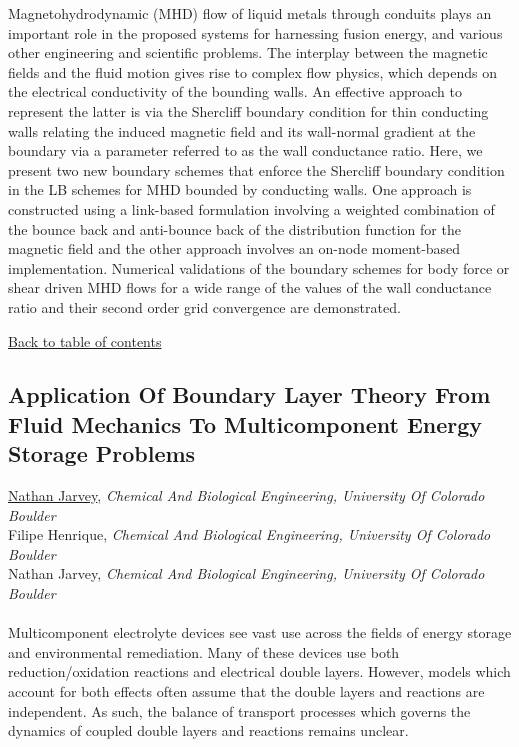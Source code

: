 \noindent Magnetohydrodynamic (MHD) flow of liquid metals through conduits plays an important role in the proposed systems for harnessing fusion energy, and various other engineering and scientific problems. The interplay between the magnetic fields and the fluid motion gives rise to complex flow physics, which depends on the electrical conductivity of the bounding walls. An effective approach to represent the latter is via the Shercliff boundary condition for thin conducting walls relating the induced magnetic field and its wall-normal gradient at the boundary via a parameter referred to as the wall conductance ratio. Here, we present two new boundary schemes that enforce the Shercliff boundary condition in the LB schemes for MHD bounded by conducting walls. One approach is constructed using a link-based formulation involving a weighted combination of the bounce back and anti-bounce back of the distribution function for the magnetic field and the other approach involves an on-node moment-based implementation. Numerical validations of the boundary schemes for body force or shear driven MHD flows for a wide range of the values of the wall conductance ratio and their second order grid convergence are demonstrated. \\ 
\begin{flushright}\vspace{-0.2 in}\hyperlink{toc}{Back to table of contents}\end{flushright}\vspace{-0.2 in}
\hypertarget{NathanJarvey}{\subsection*{\color{CUGOLD} Application Of Boundary Layer Theory From Fluid Mechanics To Multicomponent Energy Storage Problems}} \vsp 
\underline{Nathan Jarvey}, \textit{Chemical And Biological Engineering, University Of Colorado Boulder}\\ 
{Filipe Henrique}, \textit{Chemical And Biological Engineering, University Of Colorado Boulder}\\ 
{Nathan Jarvey}, \textit{Chemical And Biological Engineering, University Of Colorado Boulder}\\ 
\vspace{-0.1 in} \\ 
\noindent Multicomponent electrolyte devices see vast use across the fields of energy storage and environmental remediation. Many of these devices use both reduction/oxidation reactions and electrical double layers. However, models which account for both effects often assume that the double layers and reactions are independent. As such, the balance of transport processes which governs the dynamics of coupled double layers and reactions remains unclear.  \\ 
